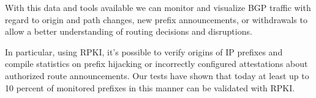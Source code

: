\documentclass[a0,portrait,posterdraft]{a0poster}
\begin{document}
\begin{mybox}
\begin{multicols}{3}
With this data and tools available we can monitor and visualize BGP traffic with
regard to origin and path changes, new prefix announcements, or withdrawals to
allow a better understanding of routing decisions and disruptions.

\noindent In particular, using RPKI, it's possible to verify origins of IP
prefixes and compile statistics on prefix hijacking or incorrectly
configured attestations about authorized route announcements. Our tests have
shown that today at least up to 10 percent of monitored prefixes in this manner
can be validated with RPKI.

\vfill

\normalsize
\nocite{*}


\end{multicols}
\end{mybox}
\vfill
\end{document}
